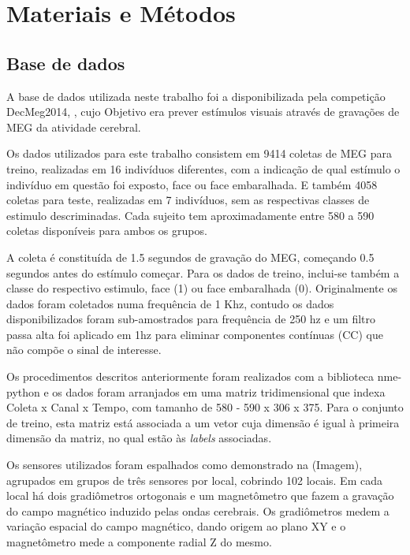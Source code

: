 \chapter{Materiais e Métodos} \label{ch:MM} %


\section{Base de dados}
A base de dados utilizada neste trabalho foi a disponibilizada pela competição DecMeg2014, \cite{KagleComp}, cujo Objetivo era prever estímulos visuais através de gravações de MEG da atividade cerebral. 

Os dados utilizados para este trabalho consistem em 9414 coletas de MEG para treino, realizadas em 16 indivíduos diferentes, com a indicação de qual estímulo o indivíduo em questão foi exposto, face ou face embaralhada. E também 4058 coletas para teste, realizadas em 7 indivíduos, sem as respectivas classes de estimulo descriminadas. Cada sujeito tem aproximadamente entre 580 a 590 coletas disponíveis para ambos os grupos. 

A coleta é constituída de 1.5 segundos de gravação do MEG, começando 0.5 segundos antes do estímulo começar. Para os dados de treino, inclui-se também a classe do respectivo estimulo, face (1) ou face embaralhada (0). Originalmente os dados foram coletados numa frequência de 1 Khz, contudo os dados disponibilizados foram sub-amostrados para frequência  de 250 hz e um filtro passa alta foi aplicado em 1hz para eliminar componentes contínuas (CC) que não compõe o sinal de interesse.

Os procedimentos descritos anteriormente foram realizados com a biblioteca nme-python e os dados foram arranjados em uma matriz tridimensional que indexa Coleta x Canal x Tempo, com tamanho de  580 - 590 x 306 x 375. Para o conjunto de treino, esta matriz está associada a um vetor cuja dimensão é igual à primeira dimensão da matriz, no qual estão às \textit{labels} associadas.

Os sensores utilizados foram espalhados como demonstrado na (Imagem), agrupados em grupos de três sensores por local, cobrindo 102 locais. Em cada local há dois gradiômetros ortogonais e um magnetômetro que fazem a gravação do campo magnético induzido pelas ondas cerebrais. Os gradiômetros medem a variação espacial do campo magnético, dando origem ao plano XY e o magnetômetro mede a componente radial Z do mesmo.   


